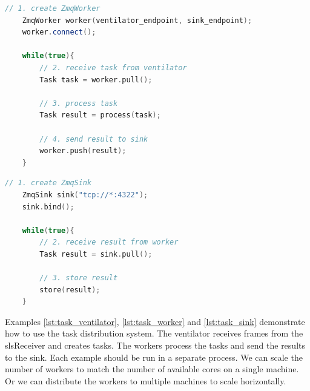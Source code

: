 \documentclass[./chapitre3.tex]{subfiles}
\begin{document}
\begin{lstlisting}[language=C++, caption=Example of a worker, label=lst:task_worker]
    // 1. create ZmqWorker
    ZmqWorker worker(ventilator_endpoint, sink_endpoint);
    worker.connect();

    while(true){
        // 2. receive task from ventilator
        Task task = worker.pull();

        // 3. process task
        Task result = process(task);

        // 4. send result to sink
        worker.push(result);
    }
\end{lstlisting}

\begin{lstlisting}[language=C++, caption=Example of a sink, label=lst:task_sink]
    // 1. create ZmqSink
    ZmqSink sink("tcp://*:4322");
    sink.bind();

    while(true){
        // 2. receive result from worker
        Task result = sink.pull();

        // 3. store result
        store(result);
    }
\end{lstlisting}

Examples \ref{lst:task_ventilator}, \ref{lst:task_worker} and \ref{lst:task_sink} demonstrate how to use the task distribution system.
The ventilator receives frames from the slsReceiver and creates tasks. The workers process the tasks and send the results to the sink.
Each example should be run in a separate process. We can scale the number of workers to match the number of available cores
on a single machine. Or we can distribute the workers to multiple machines to scale horizontally.\\
\end{document}

